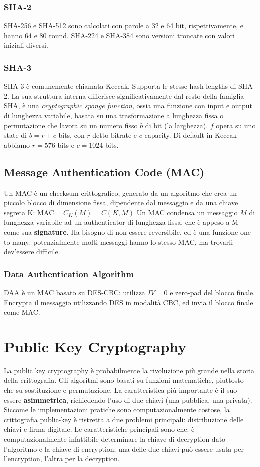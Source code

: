 \documentclass[11pt]{article}
\begin{document}
\subsubsection{SHA-2}
SHA-256 e SHA-512 sono calcolati con parole a 32 e 64 bit, rispettivamente, e hanno 64 e 80 round. SHA-224 e SHA-384 sono versioni troncate con valori iniziali diversi.
\subsubsection{SHA-3}
SHA-3 è comunemente chiamata Keccak. Supporta le stesse hash lengths di SHA-2. La sua struttura interna differisce significativamente dal resto della famiglia SHA, è una \textit{cryptographic sponge function}, ossia una funzione con input e output di lunghezza variabile, basata su una trasformazione a lunghezza fissa o permutazione che lavora su un numero fisso $b$ di bit (la larghezza). $f$ opera su uno state di $b=r+c$ bits, con $r$ detto bitrate e $c$ capacity. Di default in Keccak abbiamo $r=576$ bits e $c=1024$ bits. 
\subsection{Message Authentication Code (MAC)}
Un MAC è un checksum crittografico, generato da un algoritmo che crea un piccolo blocco di dimensione fissa, dipendente dal messaggio e da una chiave segreta K: $\textrm{MAC}=C_K(M)=C(K,M)$
Un MAC condensa un messaggio $M$ di lunghezza variabile ad un authenticator di lunghezza fissa, che è appeso a M come sua \textbf{signature}. Ha bisogno di non essere reversibile, ed è una funzione one-to-many: potenzialmente molti messaggi hanno lo stesso MAC, ma trovarli dev'essere difficile. 
\subsubsection{Data Authentication Algorithm}
DAA è un MAC basato su DES-CBC: utilizza $IV=0$ e zero-pad del blocco finale. Encrypta il messaggio utilizzando DES in modalità CBC, ed invia il blocco finale come MAC. 
\section{Public Key Cryptography}
La public key cryptography è probabilmente la rivoluzione più grande nella storia della crittografia. Gli algoritmi sono basati su funzioni matematiche, piuttosto che su sostituzione e permutazione. La caratteristica più importante è il suo essere \textbf{asimmetrica}, richiedendo l'uso di due chiavi (una pubblica, una privata). Siccome le implementazioni pratiche sono computazionalmente costose, la crittografia public-key è ristretta a due problemi principali: distribuzione delle chiavi e firma digitale. Le caratteristiche principali sono che: è computazionalmente infattibile determinare la chiave di decryption dato l'algoritmo e la chiave di encryption; una delle due chiavi può essere usata per l'encryption, l'altra per la decryption. 
\end{document}
